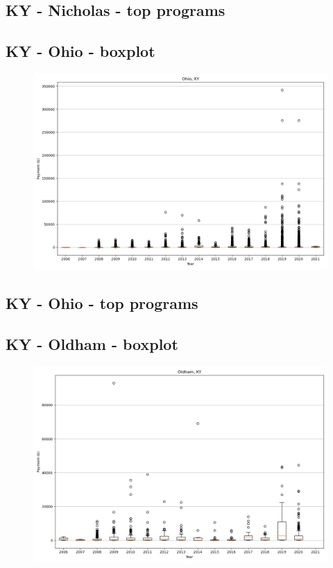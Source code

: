 \subsection*{KY - Nicholas - top programs}

\newpage
\subsection*{KY - Ohio - boxplot}
\begin{figure}[h]
\centering
\includegraphics[width=7in]{../output/boxplots/counties/Ohio-KY_boxplot.png}
\end{figure}


\subsection*{KY - Ohio - top programs}

\newpage
\subsection*{KY - Oldham - boxplot}
\begin{figure}[h]
\centering
\includegraphics[width=7in]{../output/boxplots/counties/Oldham-KY_boxplot.png}
\end{figure}


